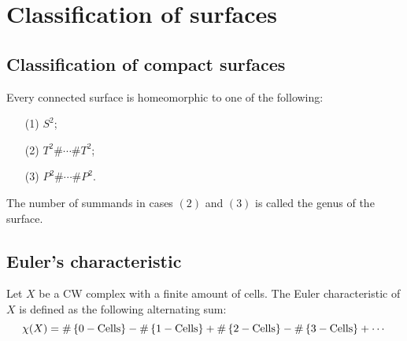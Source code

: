 \documentclass[11pt,a4paper]{article}
\begin{document}
\newpage

\section{Classification of surfaces}
\subsection{Classification of compact surfaces}

\begin{theorem}
  Every connected surface is homeomorphic to one of the following:
  \begin{enumerate}
    \item[(1)] $S^2$;
    \item[(2)] $T^2 \# \cdots \# T^2$;
    \item[(3)] $P^2 \# \cdots \# P^2$.
  \end{enumerate}
\end{theorem}
\begin{definition}[Genus]
  The number of summands in cases $(2)$ and $(3)$ is called the genus of
  the surface.
\end{definition}


\subsection{Euler's characteristic}
\begin{definition}
  Let $X$ be a CW complex with a finite amount of cells.
  The Euler characteristic of $X$ is defined as the following alternating
  sum:
  \[
    \chi(X)=
    \#\set{0-\operatorname{Cells}} -
    \#\set{1-\operatorname{Cells}} +
    \#\set{2-\operatorname{Cells}} -
    \#\set{3-\operatorname{Cells}} + \cdots
  \]
\end{definition}
\begin{example}

\end{example}





\end{document}
